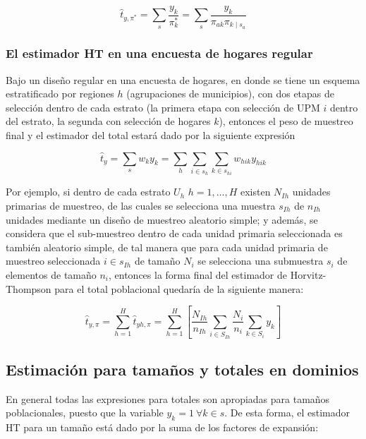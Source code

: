 \documentclass[
  10pt,
  spanish,
]{book}
\begin{document}
\[
\hat{t}_{y,\pi^*}=\sum_{s}\frac{y_k}{\pi_{k}^*}=\sum_{s}\frac{y_k}{\pi_{ak}\pi_{k\mid{s_a}}}
\]

\hypertarget{el-estimador-ht-en-una-encuesta-de-hogares-regular}{%
\subsubsection*{El estimador HT en una encuesta de hogares regular}\label{el-estimador-ht-en-una-encuesta-de-hogares-regular}}

Bajo un diseño regular en una encuesta de hogares, en donde se tiene un esquema estratificado por regiones \(h\) (agrupaciones de municipios), con dos etapas de selección dentro de cada estrato (la primera etapa con selección de UPM \(i\) dentro del estrato, la segunda con selección de hogares \(k\)), entonces el peso de muestreo final y el estimador del total estará dado por la siguiente expresión

\[
\hat{t}_y = \sum_s w_k y_k = \sum_h \sum_{i \in s_h} \sum_{k \in s_{hi}}  w_{hik} y_{hik}
\]

Por ejemplo, si dentro de cada estrato \(U_h\) \(h=1,\ldots, H\) existen \(N_{Ih}\) unidades primarias de muestreo, de las cuales se selecciona una muestra \(s_{Ih}\) de \(n_{Ih}\) unidades mediante un diseño de muestreo aleatorio simple; y además, se considera que el sub-muestreo dentro de cada unidad primaria seleccionada es también aleatorio simple, de tal manera que para cada unidad primaria de muestreo seleccionada \(i\in s_{Ih}\) de tamaño \(N_i\) se selecciona una submuestra \(s_i\) de elementos de tamaño \(n_i\), entonces la forma final del estimador de Horvitz-Thompson para el total poblacional quedaría de la siguiente manera:

\[
\hat{t}_{y,\pi}=\sum_{h=1}^H\hat{t}_{yh,\pi}=\sum_{h=1}^H\left[\frac{N_{Ih}}{n_{Ih}}\sum_{i\in S_{Ih}}\frac{N_i}{n_i}\sum_{k\in S_i}y_k\right]
\]

\hypertarget{estimaciuxf3n-para-tamauxf1os-y-totales-en-dominios}{%
\subsection{Estimación para tamaños y totales en dominios}\label{estimaciuxf3n-para-tamauxf1os-y-totales-en-dominios}}

En general todas las expresiones para totales son apropiadas para tamaños poblacionales, puesto que la variable \(y_k = 1 \ \forall k \in s\). De esta forma, el estimador HT para un tamaño está dado por la suma de los factores de expansión:
\end{document}
